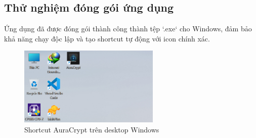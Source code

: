 \subsection{Thử nghiệm đóng gói ứng dụng}
Ứng dụng đã được đóng gói thành công thành tệp `.exe` cho Windows, đảm bảo khả năng chạy độc lập và tạo shortcut tự động với icon chính xác.
\begin{figure}[H]
    \centering
    \includegraphics[width=0.6\textwidth]{images/desktop_shortcut_final.png}
    \caption{Shortcut AuraCrypt trên desktop Windows}
    \label{fig:desktop_shortcut}
\end{figure}
\newpage